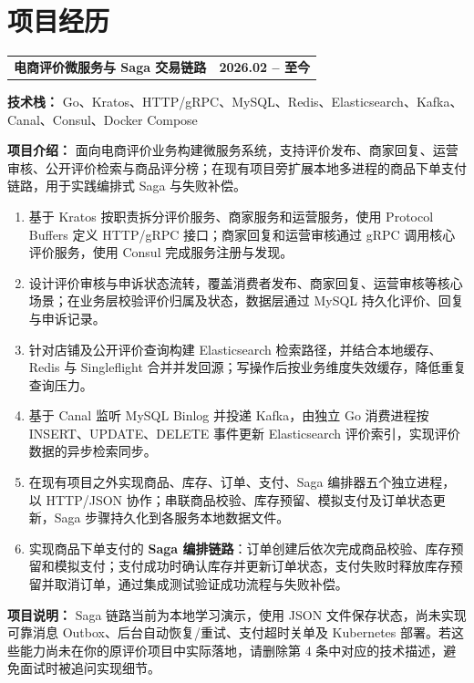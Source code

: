 \documentclass[UTF8,10.5pt,a4paper]{ctexart}
\begin{document}
\section*{项目经历}

\begin{tabularx}{\linewidth}{@{}Xr@{}}
\textbf{\large 电商评价微服务与 Saga 交易链路} & \textbf{2026.02 -- 至今}\\
\end{tabularx}

\textbf{技术栈：} Go、Kratos、HTTP/gRPC、MySQL、Redis、Elasticsearch、Kafka、Canal、Consul、Docker Compose

\textbf{项目介绍：} 面向电商评价业务构建微服务系统，支持评价发布、商家回复、运营审核、公开评价检索与商品评分榜；在现有项目旁扩展本地多进程的商品下单支付链路，用于实践编排式 Saga 与失败补偿。

\begin{enumerate}
  \item 基于 Kratos 按职责拆分评价服务、商家服务和运营服务，使用 Protocol Buffers 定义 HTTP/gRPC 接口；商家回复和运营审核通过 gRPC 调用核心评价服务，使用 Consul 完成服务注册与发现。
  \item 设计评价审核与申诉状态流转，覆盖消费者发布、商家回复、运营审核等核心场景；在业务层校验评价归属及状态，数据层通过 MySQL 持久化评价、回复与申诉记录。
  \item 针对店铺及公开评价查询构建 Elasticsearch 检索路径，并结合本地缓存、Redis 与 Singleflight 合并并发回源；写操作后按业务维度失效缓存，降低重复查询压力。
  \item 基于 Canal 监听 MySQL Binlog 并投递 Kafka，由独立 Go 消费进程按 INSERT、UPDATE、DELETE 事件更新 Elasticsearch 评价索引，实现评价数据的异步检索同步。
  \item 在现有项目之外实现商品、库存、订单、支付、Saga 编排器五个独立进程，以 HTTP/JSON 协作；串联商品校验、库存预留、模拟支付及订单状态更新，Saga 步骤持久化到各服务本地数据文件。
  \item 实现商品下单支付的 \textbf{Saga 编排链路}：订单创建后依次完成商品校验、库存预留和模拟支付；支付成功时确认库存并更新订单状态，支付失败时释放库存预留并取消订单，通过集成测试验证成功流程与失败补偿。
\end{enumerate}

\textbf{项目说明：} Saga 链路当前为本地学习演示，使用 JSON 文件保存状态，尚未实现可靠消息 Outbox、后台自动恢复/重试、支付超时关单及 Kubernetes 部署。若这些能力尚未在你的原评价项目中实际落地，请删除第 4 条中对应的技术描述，避免面试时被追问实现细节。
\end{document}
